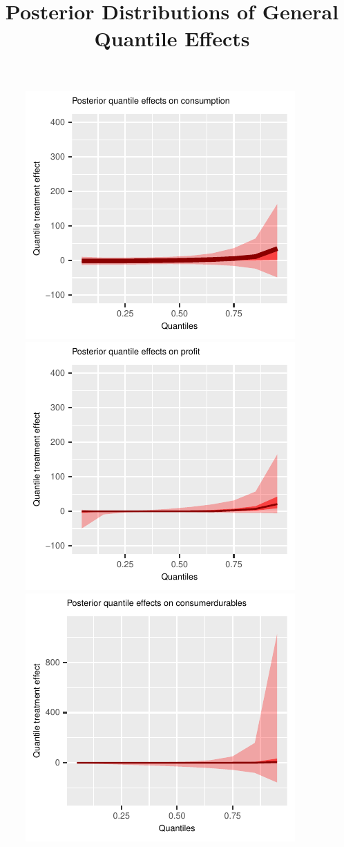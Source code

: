 \documentclass[AER]{AEA}
\begin{document}
\clearpage
\newpage







 \begin{figure}[h!]
  \centering
  \title{Posterior Distributions of General Quantile Effects}
    \includegraphics{posterior_parent_quantile_TEs_consumption_lognormal.pdf}
        \includegraphics{posterior_parent_quantile_TEs_profit_lognormal.pdf}\\
    \includegraphics{posterior_parent_quantile_TEs_consumerdurables_lognormal.pdf}

\end{figure}
\end{document}

